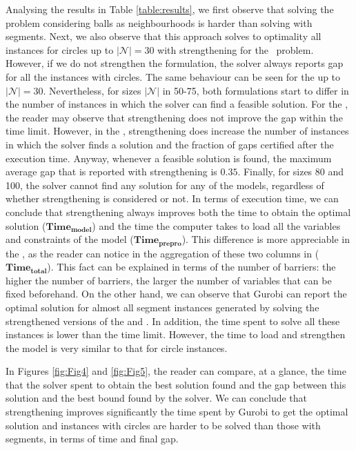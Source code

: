 \documentclass[a4paper,  review, authoryear, 1p., doubleblind]{elsarticle}
\newcommand{\TSPHN}{{\sf{H-TSPHN}\xspace }}
\newcommand{\TSPN}{{\sf{H-TSPN}\xspace }}
\begin{document}
Analysing the results in Table \ref{table:results}, we first observe that solving the problem considering balls as neighbourhoods is harder than solving with segments. Next, we also observe that this approach solves to optimality all instances for circles up to $|\mathcal{N}|=30$ with strengthening for the \TSPHN \ problem. However, if we do not strengthen the formulation, the solver always reports gap for all the instances with circles. The same behaviour can be seen for the \TSPN \xspace up to $|\mathcal{N}|=30$. Nevertheless, for sizes $|\mathcal{N}|$ in 50-75, both formulations start to differ in the number of instances in which the solver can find a feasible solution. For the \TSPHN, the reader may observe that strengthening does not improve the gap within the time limit. However, in the \TSPN, strengthening does increase the number of instances in which the solver finds a solution and the fraction of gaps certified after the execution time. Anyway, whenever a feasible solution is found, the maximum average gap that is reported with strengthening is $0.35$. Finally, for sizes 80 and 100, the solver cannot find any solution for any of the models, regardless of whether strengthening is considered or not. In terms of execution time, we can conclude that strengthening always improves both the time to obtain the optimal solution ($\boldsymbol{Time_{model}}$) and the time the computer takes to load all the variables and constraints of the model ($\boldsymbol{Time_{prepro}}$). This difference is more appreciable in the \TSPHN, as the reader can notice in the aggregation of these two columns in ($\boldsymbol{Time_{total}}$). This fact can be explained in terms of the number of barriers: the higher the number of barriers, the larger the number of variables that can be fixed beforehand. On the other hand, we can observe that Gurobi can report the optimal solution for almost all segment instances generated by solving the strengthened versions of the \TSPHN\xspace and \TSPN. In addition, the time spent to solve all these instances is lower than the time limit. However, the time to load and strengthen the model is very similar to that for circle instances.

In Figures \ref{fig:Fig4} and \ref{fig:Fig5}, the reader can compare, at a glance, the time that the solver spent to obtain the best solution found and the gap between this solution and the best bound found by the solver. We can conclude that strengthening improves significantly the time spent by Gurobi to get the optimal solution and instances with circles are harder to be solved than those with segments, in terms of time and final gap.
\end{document}
